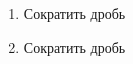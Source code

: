 \documentclass[10pt, a4paper]{article}
\begin{document}
\begin{enumerate}
\begin{multicols}{3}
\begin{enumerate}
		\end{enumerate}	
	\end{multicols}
	\item Сократить дробь
	\begin{multicols}{3}
		\begin{enumerate}
		\end{enumerate}
	\end{multicols}
	\item Сократить дробь
	\begin{multicols}{4}
		\begin{enumerate}

\end{enumerate}
\end{multicols}
\end{enumerate}
\end{document}
